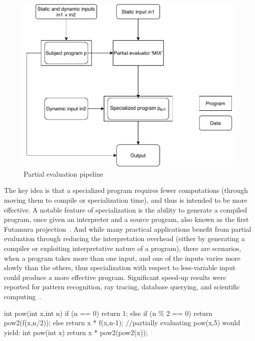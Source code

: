 \begin{figure}
    \centering
    \includegraphics{figures/MixCommutativity.pdf}
    \caption{Partial evaluation pipeline}
    \label{fig:mix}
\end{figure}

The key idea is that a specialized program requires fewer computations (through moving them to compile or specialization time), and thus is intended to be more effective. A notable feature of specialization is the ability to generate a compiled program, once given an interpreter and a source program, also known as the first Futamura projection~\cite{Futamura1999}.
And while many practical applications benefit from partial evaluation through reducing the interpretation overhead (either by generating a compiler or exploiting interpretative nature of a program), there are scenarios, when a program takes more than one input, and one of the inputs varies more slowly than the others, thus specialization with respect to less-variable input could produce a more effective program.
Significant speed-up results were reported for pattern recognition, ray tracing, database querying, and scientific computing~\cite{Jones1993}.

\begin{code}[language=C,label=fig:pow,caption=Pow function partial evaluation example]
int pow(int x,int n){
    if (n == 0) return 1;
    else if (n \% 2 == 0) { 
        return pow2(f(x,n/2));
    }
    else return x * f(x,n-1);
}
//partially evaluating pow(x,5) would yield:
int pow(int x){
    return x * pow2(pow2(x));
}
\end{code}


